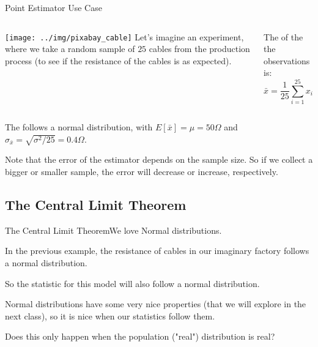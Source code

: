 \begin{frame}{Point Estimator Use Case}
  \begin{columns}[T]
    \hspace{.05\textwidth}\texttt{[image: ../img/pixabay\_cable]}
    Let's imagine an experiment, where we take a random sample of $25$ cables
    from the production process (to see if the resistance of the cables is as
    expected).\bigskip

    The  of the the observations is:
    \begin{equation*}
    \bar{x} = \frac{1}{25}\sum\limits_{i=1}^{25}{x_i}
    \end{equation*}
  \end{columns}
  \bigskip



The  follows a normal distribution, with $E[\bar{x}] = \mu = 50\Omega$ and $\sigma_{\bar{x}} = \sqrt{\sigma^2/25} = 0.4\Omega$.\bigskip

Note that the error of the estimator depends on the sample size. So if we collect a bigger or smaller sample, the error will decrease or increase, respectively.
\end{frame}


\subsection{The Central Limit Theorem}

\begin{frame}{The Central Limit Theorem}{We love Normal distributions.}

In the previous example, the resistance of cables in our imaginary factory follows a normal distribution. \bigskip

So the  statistic for this model will also follow a normal distribution.\bigskip

Normal distributions have some very nice properties (that we will explore in the next class), so it is nice when our statistics follow them.\bigskip

Does this only happen when the population ("real") distribution is real?\bigskip
\end{frame}

